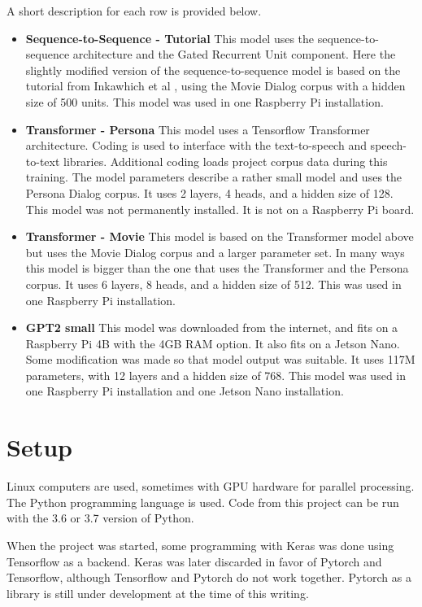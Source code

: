 A short description for each row is provided below.

\begin{itemize}
	\item \textbf{Sequence-to-Sequence - Tutorial} This model uses the sequence-to-sequence architecture and the Gated Recurrent Unit component. Here the slightly modified version of the sequence-to-sequence model is based on the tutorial from Inkawhich et al \cite{2018Inkawhich}, using the Movie Dialog corpus with a hidden size of 500 units. This model was used in one Raspberry Pi installation.
	
	\item \textbf{Transformer - Persona} This model uses a Tensorflow Transformer architecture. Coding is used to interface with the text-to-speech and speech-to-text libraries. Additional coding loads project corpus data during this training. The model parameters describe a rather small model and uses the Persona Dialog corpus. It uses 2 layers, 4  heads, and a hidden size of 128. This model was not permanently installed. It is not on a Raspberry Pi board.
	
	\item \textbf{Transformer - Movie} This model is based on the Transformer model above but uses the Movie Dialog corpus and a larger parameter set. In many ways this model is bigger than the one that uses the Transformer and the Persona corpus. It uses 6 layers, 8 heads, and a hidden size of 512. This was used in one Raspberry Pi installation.
	
	\item \textbf{GPT2 small} This model was downloaded from the internet, and fits on a Raspberry Pi 4B with the 4GB RAM option. It also fits on a Jetson Nano. Some modification was made so that model output was suitable. It uses 117M parameters, with 12 layers and a hidden size of 768. This model was used in one Raspberry Pi installation and one Jetson Nano installation.
\end{itemize}

\section{Setup}

Linux computers are used, sometimes with \ac{GPU} hardware for parallel processing. The Python programming language is used. Code from this project can be run with the 3.6 or 3.7 version of Python.

When the project was started, some programming with Keras was done using Tensorflow as a backend. Keras was later discarded in favor of Pytorch and Tensorflow, although Tensorflow and Pytorch do not work together. Pytorch as a library is still under development at the time of this writing.


